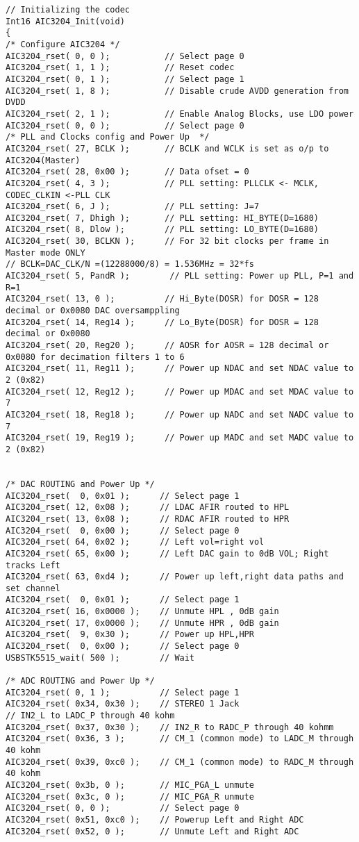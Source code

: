 \begin{lstlisting}[caption=DSP code.]
// Initializing the codec
Int16 AIC3204_Init(void)
{	
/* Configure AIC3204 */
AIC3204_rset( 0, 0 );           // Select page 0
AIC3204_rset( 1, 1 );           // Reset codec
AIC3204_rset( 0, 1 );           // Select page 1
AIC3204_rset( 1, 8 );           // Disable crude AVDD generation from DVDD
AIC3204_rset( 2, 1 );           // Enable Analog Blocks, use LDO power
AIC3204_rset( 0, 0 );           // Select page 0
/* PLL and Clocks config and Power Up  */
AIC3204_rset( 27, BCLK );       // BCLK and WCLK is set as o/p to AIC3204(Master)
AIC3204_rset( 28, 0x00 );       // Data ofset = 0
AIC3204_rset( 4, 3 );           // PLL setting: PLLCLK <- MCLK, CODEC_CLKIN <-PLL CLK
AIC3204_rset( 6, J );           // PLL setting: J=7
AIC3204_rset( 7, Dhigh );       // PLL setting: HI_BYTE(D=1680)
AIC3204_rset( 8, Dlow );        // PLL setting: LO_BYTE(D=1680)
AIC3204_rset( 30, BCLKN );      // For 32 bit clocks per frame in Master mode ONLY
// BCLK=DAC_CLK/N =(12288000/8) = 1.536MHz = 32*fs
AIC3204_rset( 5, PandR );        // PLL setting: Power up PLL, P=1 and R=1
AIC3204_rset( 13, 0 );          // Hi_Byte(DOSR) for DOSR = 128 decimal or 0x0080 DAC oversamppling
AIC3204_rset( 14, Reg14 );      // Lo_Byte(DOSR) for DOSR = 128 decimal or 0x0080
AIC3204_rset( 20, Reg20 );      // AOSR for AOSR = 128 decimal or 0x0080 for decimation filters 1 to 6
AIC3204_rset( 11, Reg11 );      // Power up NDAC and set NDAC value to 2 (0x82)
AIC3204_rset( 12, Reg12 );      // Power up MDAC and set MDAC value to 7
AIC3204_rset( 18, Reg18 );      // Power up NADC and set NADC value to 7
AIC3204_rset( 19, Reg19 );      // Power up MADC and set MADC value to 2 (0x82)


/* DAC ROUTING and Power Up */
AIC3204_rset(  0, 0x01 );      // Select page 1
AIC3204_rset( 12, 0x08 );      // LDAC AFIR routed to HPL
AIC3204_rset( 13, 0x08 );      // RDAC AFIR routed to HPR
AIC3204_rset(  0, 0x00 );      // Select page 0
AIC3204_rset( 64, 0x02 );      // Left vol=right vol
AIC3204_rset( 65, 0x00 );      // Left DAC gain to 0dB VOL; Right tracks Left
AIC3204_rset( 63, 0xd4 );      // Power up left,right data paths and set channel
AIC3204_rset(  0, 0x01 );      // Select page 1
AIC3204_rset( 16, 0x0000 );    // Unmute HPL , 0dB gain
AIC3204_rset( 17, 0x0000 );    // Unmute HPR , 0dB gain
AIC3204_rset(  9, 0x30 );      // Power up HPL,HPR
AIC3204_rset(  0, 0x00 );      // Select page 0
USBSTK5515_wait( 500 );        // Wait

/* ADC ROUTING and Power Up */
AIC3204_rset( 0, 1 );          // Select page 1
AIC3204_rset( 0x34, 0x30 );    // STEREO 1 Jack
// IN2_L to LADC_P through 40 kohm
AIC3204_rset( 0x37, 0x30 );    // IN2_R to RADC_P through 40 kohmm
AIC3204_rset( 0x36, 3 );       // CM_1 (common mode) to LADC_M through 40 kohm
AIC3204_rset( 0x39, 0xc0 );    // CM_1 (common mode) to RADC_M through 40 kohm
AIC3204_rset( 0x3b, 0 );       // MIC_PGA_L unmute
AIC3204_rset( 0x3c, 0 );       // MIC_PGA_R unmute
AIC3204_rset( 0, 0 );          // Select page 0
AIC3204_rset( 0x51, 0xc0 );    // Powerup Left and Right ADC
AIC3204_rset( 0x52, 0 );       // Unmute Left and Right ADC


\end{lstlisting}
